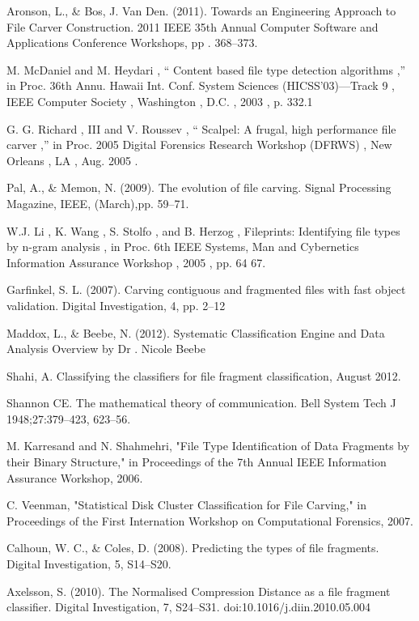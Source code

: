 Aronson, L., \& Bos, J. Van Den. (2011). Towards an Engineering Approach to File Carver Construction. 2011 IEEE 35th Annual Computer Software and Applications Conference Workshops, pp . 368–373.

M. McDaniel and M. Heydari , “ Content based file type detection algorithms ,” in Proc. 36th Annu. Hawaii Int. Conf. System Sciences (HICSS’03)—Track 9 , IEEE Computer Society , Washington , D.C. , 2003 , p. 332.1

G. G. Richard , III and V. Roussev , “ Scalpel: A frugal, high performance file carver ,” in Proc. 2005 Digital Forensics Research Workshop (DFRWS) , New Orleans , LA , Aug. 2005 .

Pal, A., \& Memon, N. (2009). The evolution of file carving. Signal Processing Magazine, IEEE, (March),pp. 59–71.

W.J. Li , K. Wang , S. Stolfo , and B. Herzog , Fileprints: Identifying
file types by n-gram analysis , in Proc. 6th IEEE Systems, Man and
Cybernetics Information Assurance Workshop , 2005 , pp. 64 67.

Garfinkel, S. L. (2007). Carving contiguous and fragmented files with fast object validation. Digital Investigation, 4, pp. 2–12

Maddox, L., \& Beebe, N. (2012). Systematic Classification Engine and Data Analysis Overview by Dr . Nicole Beebe

Shahi, A. Classifying the classifiers for file fragment classification, August 2012.

Shannon CE. The mathematical theory of communication. Bell System Tech J 1948;27:379–423, 623–56.

M. Karresand and N. Shahmehri, "File Type Identification of Data Fragments by their Binary Structure," in Proceedings of the 7th Annual IEEE Information Assurance Workshop, 2006.

C. Veenman, "Statistical Disk Cluster Classification for File Carving," in Proceedings of the First Internation Workshop on Computational Forensics, 2007.

Calhoun, W. C., \& Coles, D. (2008). Predicting the types of file fragments. Digital Investigation, 5, S14–S20.


Axelsson, S. (2010). The Normalised Compression Distance as a file fragment classifier. Digital Investigation, 7, S24–S31. doi:10.1016/j.diin.2010.05.004

